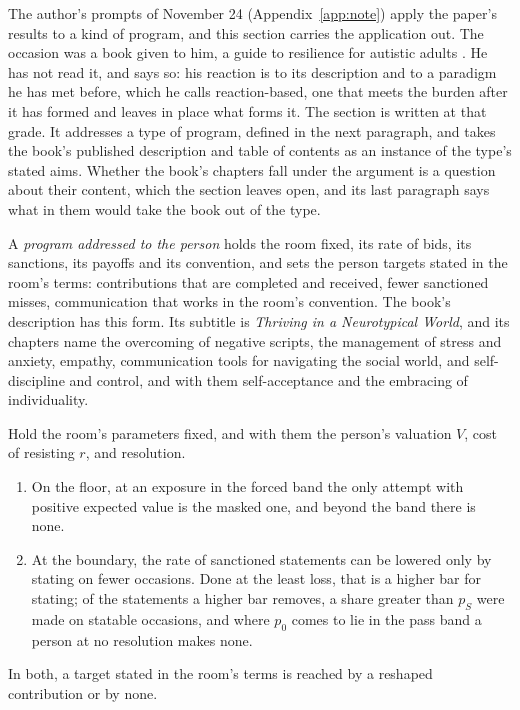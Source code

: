 The author's prompts of November 24 (Appendix~\ref{app:note}) apply the paper's results to a kind of program, and this section carries the application out. The occasion was a book given to him, a guide to resilience for autistic adults \cite{GoldsteinBrooks2026}. He has not read it, and says so: his reaction is to its description and to a paradigm he has met before, which he calls reaction-based, one that meets the burden after it has formed and leaves in place what forms it. The section is written at that grade. It addresses a type of program, defined in the next paragraph, and takes the book's published description and table of contents as an instance of the type's stated aims. Whether the book's chapters fall under the argument is a question about their content, which the section leaves open, and its last paragraph says what in them would take the book out of the type.

A \emph{program addressed to the person} holds the room fixed, its rate of bids, its sanctions, its payoffs and its convention, and sets the person targets stated in the room's terms: contributions that are completed and received, fewer sanctioned misses, communication that works in the room's convention. The book's description has this form. Its subtitle is \emph{Thriving in a Neurotypical World}, and its chapters name the overcoming of negative scripts, the management of stress and anxiety, empathy, communication tools for navigating the social world, and self-discipline and control, and with them self-acceptance and the embracing of individuality.

\begin{corollary}\label{cor:programs}
Hold the room's parameters fixed, and with them the person's valuation $V$, cost of resisting $r$, and resolution.
\begin{enumerate}[label=(\alph*)]
\item On the floor, at an exposure in the forced band the only attempt with positive expected value is the masked one, and beyond the band there is none.
\item At the boundary, the rate of sanctioned statements can be lowered only by stating on fewer occasions. Done at the least loss, that is a higher bar for stating; of the statements a higher bar removes, a share greater than $p_S$ were made on statable occasions, and where $p_0$ comes to lie in the pass band a person at no resolution makes none.
\end{enumerate}
In both, a target stated in the room's terms is reached by a reshaped contribution or by none.
\end{corollary}

